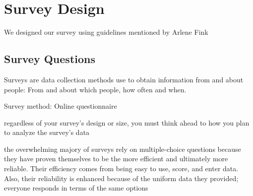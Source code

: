 \documentclass[manuscript,screen,review]{acmart}
\begin{document}

	
\section{Survey Design}

We designed our survey using guidelines mentioned by Arlene Fink \cite{alma991013701999705153}

\subsection{Survey Questions}

Surveys are data collection methods use to obtain information from and about people: From and about which people, how often and when.

Survey method: Online questionnaire

regardless of your survey's design or size, you must think ahead to how you plan to analyze the survey's data 

the overwhelming majory of surveys rely on multiple-choice questions because they have proven themselves to be the more efficient and ultimately more reliable. Their efficiency comes from being easy to use, score, and enter data. Also, their reliability is enhanced because of the uniform data they provided; everyone responds in terms of the same options
\end{document}
